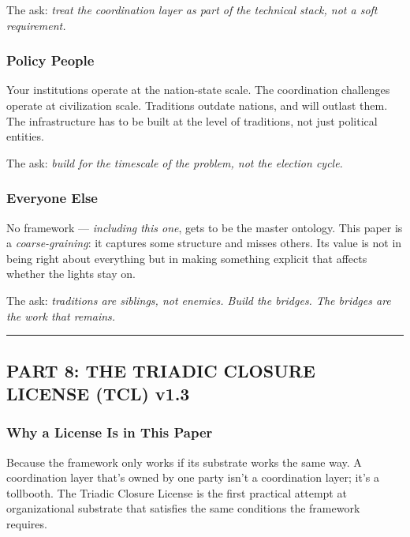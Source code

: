 \documentclass[
]{article}
\begin{document}
The ask: \emph{treat the coordination layer as part of the technical
stack, not a soft requirement.}

\subsubsection{Policy People}\label{policy-people}

Your institutions operate at the nation-state scale. The coordination
challenges operate at civilization scale. Traditions outdate nations,
and will outlast them. The infrastructure has to be built at the level
of traditions, not just political entities.

The ask: \emph{build for the timescale of the problem, not the election
cycle.}

\subsubsection{Everyone Else}\label{everyone-else}

No framework --- \emph{including this one}, gets to be the master
ontology. This paper is a \emph{coarse-graining}: it captures some
structure and misses others. Its value is not in being right about
everything but in making something explicit that affects whether the
lights stay on.

The ask: \emph{traditions are siblings, not enemies. Build the bridges.
The bridges are the work that remains.}

\begin{center}\rule{0.5\linewidth}{0.5pt}\end{center}

\subsection{PART 8: THE TRIADIC CLOSURE LICENSE (TCL)
v1.3}\label{part-8-the-triadic-closure-license-tcl-v1.3}

\subsubsection{Why a License Is in This
Paper}\label{why-a-license-is-in-this-paper}

Because the framework only works if its substrate works the same way. A
coordination layer that's owned by one party isn't a coordination layer;
it's a tollbooth. The Triadic Closure License is the first practical
attempt at organizational substrate that satisfies the same conditions
the framework requires.
\end{document}
